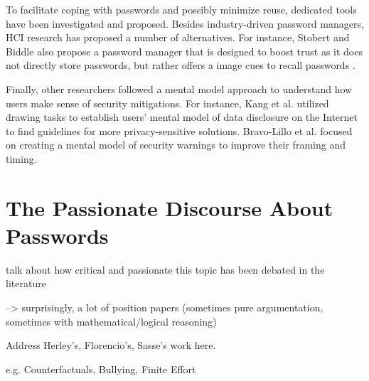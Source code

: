 	To facilitate coping with passwords and possibly minimize reuse, dedicated tools have been investigated and proposed. Besides industry-driven password managers, HCI research has proposed a number of alternatives. For instance, Stobert and Biddle also propose a password manager that is designed to boost trust as it does not directly store passwords, but rather offers a image cues to recall passwords \cite{Stobert2014PWMThatDoesntRemember}. 
	
	Finally, other researchers followed a mental model approach to understand how users make sense of security mitigations. For instance, Kang et al. utilized drawing tasks to establish users' mental model of data disclosure on the Internet \cite{Kang2015MentalModelsDrawing} to find guidelines for more privacy-sensitive solutions. Bravo-Lillo et al. focused on creating a mental model of security warnings \cite{BravoLillo2011WarningsMentalModel} to improve their framing and timing.
	
	
\section{The Passionate Discourse About Passwords}\label{sec:rw:passionate_discourse}
talk about how critical and passionate this topic has been debated in the literature

--> surprisingly, a lot of position papers (sometimes pure argumentation, sometimes with mathematical/logical reasoning) 

Address Herley's, Florencio's, Sasse's work here. 

e.g. Counterfactuals, Bullying, Finite Effort 
